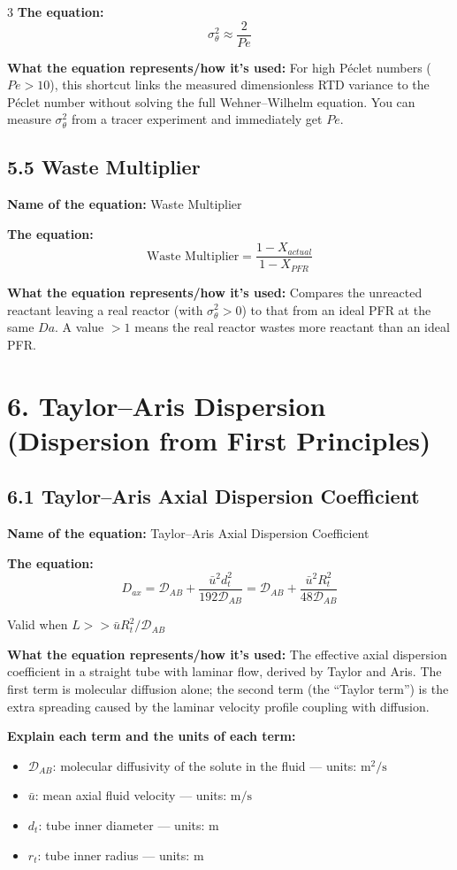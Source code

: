 \documentclass[8pt]{extarticle}
\begin{document}
\begin{multicols*}{3}
\textbf{The equation:}
\[
\sigma_\theta^2\approx \frac{2}{Pe}
\]

\textbf{What the equation represents/how it's used:} For high P\'eclet numbers (\(Pe>10\)), this shortcut links the measured dimensionless RTD variance to the P\'eclet number without solving the full Wehner--Wilhelm equation. You can measure \(\sigma_\theta^2\) from a tracer experiment and immediately get \(Pe\).

\subsection*{5.5 Waste Multiplier}

\textbf{Name of the equation:} Waste Multiplier

\textbf{The equation:}
\[
\text{Waste Multiplier}=\frac{1-X_{actual}}{1-X_{PFR}}
\]

\textbf{What the equation represents/how it's used:} Compares the unreacted reactant leaving a real reactor (with \(\sigma_\theta^2>0\)) to that from an ideal PFR at the same \(Da\). A value \(>1\) means the real reactor wastes more reactant than an ideal PFR.

\section*{6. Taylor--Aris Dispersion (Dispersion from First Principles)}

\subsection*{6.1 Taylor--Aris Axial Dispersion Coefficient}

\textbf{Name of the equation:} Taylor--Aris Axial Dispersion Coefficient

\textbf{The equation:}
\[
D_{ax}=\mathcal{D}_{AB}+\frac{\bar{u}^2d_t^2}{192\mathcal{D}_{AB}}
=\mathcal{D}_{AB}+\frac{\bar{u}^2R_t^2}{48\mathcal{D}_{AB}}
\]

Valid when \(L >> \bar{u}R^{2}_{t}/\mathcal{D}_{AB}\)


\textbf{What the equation represents/how it's used:} The effective axial dispersion coefficient in a straight tube with laminar flow, derived by Taylor and Aris. The first term is molecular diffusion alone; the second term (the ``Taylor term'') is the extra spreading caused by the laminar velocity profile coupling with diffusion.

\textbf{Explain each term and the units of each term:}
\begin{itemize}
\item \(\mathcal{D}_{AB}\): molecular diffusivity of the solute in the fluid --- units: \(\mathrm{m^2/s}\)
\item \(\bar{u}\): mean axial fluid velocity --- units: \(\mathrm{m/s}\)
\item \(d_t\): tube inner diameter --- units: \(\mathrm{m}\)
\item \(r_t\): tube inner radius --- units: \(\mathrm{m}\)
\end{itemize}


\end{multicols*}
\end{document}
